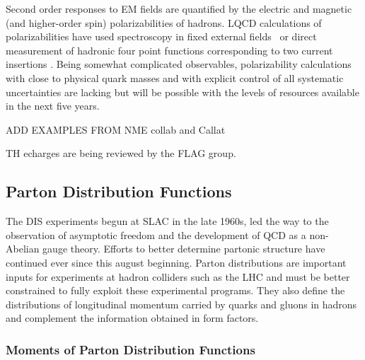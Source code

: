 Second order responses to EM fields are quantified by the electric and magnetic (and higher-order spin) polarizabilities of hadrons. LQCD calculations of polarizabilities have used spectroscopy in fixed external fields~\cite{Savage:2016kon,Shanahan:2017bgi,Tiburzi:2017iux} or direct measurement of hadronic four point functions corresponding to two current insertions \cite{Engelhardt:2007ub,Ref:TwoCur}. Being somewhat complicated observables, polarizability calculations with close to physical quark masses and with explicit control of all systematic uncertainties are lacking but will be possible with the levels of resources available in the next five years.


ADD EXAMPLES FROM NME collab and Callat

TH echarges are being reviewed by the FLAG group.

\subsection{Parton Distribution Functions}



The DIS experiments begun at SLAC in the late 1960s, led the way to the observation of asymptotic freedom and the development of QCD as a non-Abelian gauge theory. Efforts to better determine partonic structure have continued ever since this august beginning. Parton distributions are important inputs for experiments at hadron colliders such as the LHC and must be better constrained to fully exploit these experimental programs. They also define the distributions of longitudinal momentum carried by quarks and gluons in hadrons and complement the information obtained in form factors.


\subsubsection{Moments of Parton Distribution Functions}

